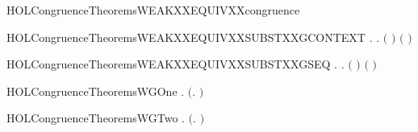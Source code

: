 \newcommand{\HOLCongruenceTheoremsSTRONGXXEQUIVXXSUBSTXXCONTEXT}{\UseVerbatim{HOLCongruenceTheoremsSTRONGXXEQUIVXXSUBSTXXCONTEXT}}
\begin{SaveVerbatim}{HOLCongruenceTheoremsWEAKXXEQUIVXXcongruence}
\HOLTokenTurnstile{}  
\end{SaveVerbatim}
\newcommand{\HOLCongruenceTheoremsWEAKXXEQUIVXXcongruence}{\UseVerbatim{HOLCongruenceTheoremsWEAKXXEQUIVXXcongruence}}
\begin{SaveVerbatim}{HOLCongruenceTheoremsWEAKXXEQUIVXXSUBSTXXGCONTEXT}
\HOLTokenTurnstile{} \HOLSymConst{\HOLTokenForall{}} .
          \HOLSymConst{\HOLTokenImp{}} \HOLSymConst{\HOLTokenForall{}}.   \HOLSymConst{\HOLTokenImp{}}  \ensuremath{(} \ensuremath{)} \ensuremath{(} \ensuremath{)}
\end{SaveVerbatim}
\newcommand{\HOLCongruenceTheoremsWEAKXXEQUIVXXSUBSTXXGCONTEXT}{\UseVerbatim{HOLCongruenceTheoremsWEAKXXEQUIVXXSUBSTXXGCONTEXT}}
\begin{SaveVerbatim}{HOLCongruenceTheoremsWEAKXXEQUIVXXSUBSTXXGSEQ}
\HOLTokenTurnstile{} \HOLSymConst{\HOLTokenForall{}} .    \HOLSymConst{\HOLTokenImp{}} \HOLSymConst{\HOLTokenForall{}}.   \HOLSymConst{\HOLTokenImp{}}  \ensuremath{(} \ensuremath{)} \ensuremath{(} \ensuremath{)}
\end{SaveVerbatim}
\newcommand{\HOLCongruenceTheoremsWEAKXXEQUIVXXSUBSTXXGSEQ}{\UseVerbatim{HOLCongruenceTheoremsWEAKXXEQUIVXXSUBSTXXGSEQ}}
\begin{SaveVerbatim}{HOLCongruenceTheoremsWGOne}
\HOLTokenTurnstile{} \HOLSymConst{\HOLTokenForall{}}.  \ensuremath{(}\HOLTokenLambda{}. \HOLSymConst{\ensuremath{\ldotp}}\ensuremath{)}
\end{SaveVerbatim}
\newcommand{\HOLCongruenceTheoremsWGOne}{\UseVerbatim{HOLCongruenceTheoremsWGOne}}
\begin{SaveVerbatim}{HOLCongruenceTheoremsWGTwo}
\HOLTokenTurnstile{} \HOLSymConst{\HOLTokenForall{}}.  \ensuremath{(}\HOLTokenLambda{}. \ensuremath{)}
\end{SaveVerbatim}
